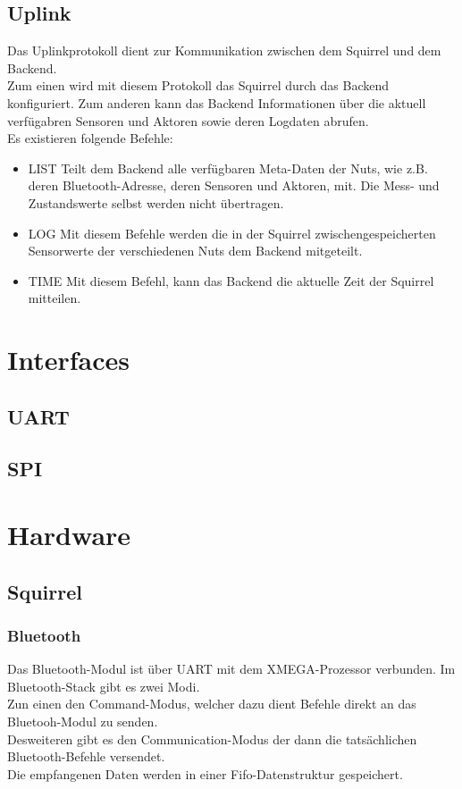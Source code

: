 \documentclass[12pt,a4paper]{article}
\begin{document}
	\subsection{Uplink}
Das Uplinkprotokoll dient zur Kommunikation zwischen dem Squirrel und dem Backend.\\
Zum einen wird mit diesem Protokoll das Squirrel durch das Backend konfiguriert. Zum anderen kann das Backend Informationen über die aktuell verfügabren Sensoren und Aktoren sowie deren Logdaten abrufen.\\
Es existieren folgende Befehle:
\begin{itemize}
	\item{LIST}
Teilt dem Backend alle verfügbaren Meta-Daten der Nuts, wie z.B. deren Bluetooth-Adresse, deren Sensoren und Aktoren, mit. Die Mess- und Zustandswerte selbst werden nicht übertragen.

	\item{LOG}
Mit diesem Befehle werden die in der Squirrel zwischengespeicherten Sensorwerte der verschiedenen Nuts dem Backend mitgeteilt.

	\item{TIME}
Mit diesem Befehl, kann das Backend die aktuelle Zeit der Squirrel mitteilen.

\end{itemize}

\section{Interfaces}
	\subsection{UART}
	\subsection{SPI}

\section{Hardware}
	\subsection{Squirrel}
	\subsubsection{Bluetooth}
Das Bluetooth-Modul ist über UART mit dem XMEGA-Prozessor verbunden. Im Bluetooth-Stack gibt es zwei Modi. \\
Zun einen den Command-Modus, welcher dazu dient Befehle direkt an das Bluetooh-Modul zu senden.\\
Desweiteren gibt es den Communication-Modus der dann die tatsächlichen Bluetooth-Befehle versendet.\\
Die empfangenen Daten werden in einer Fifo-Datenstruktur gespeichert.\\
\end{document}
